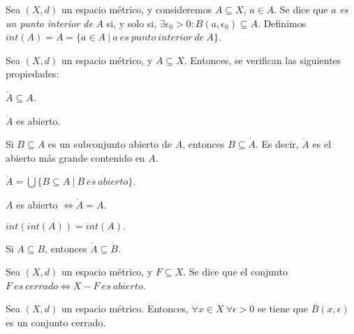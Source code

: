 \begin{ndef}
Sea $(X,d)$ un espacio métrico, y consideremos $A\subseteq X$, $a\in A$. Se dice que $a$ \emph{es un punto interior de} $A$ si, y solo si, $\exists \epsilon_0 > 0: B(a,\epsilon_0)\subseteq A$.  Definimos $int(A) = \mathring{A} = \{ a\in A \ | \ a\ es\ punto\ interior\ de\ A\}$.
\end{ndef}



\begin{nprop}
Sea $(X,d)$ un espacio métrico, y $A\subseteq X$. Entonces, se verifican las siguientes propiedades:

\begin{nlist}
\item $\mathring{A} \subseteq A$.

\item $\mathring{A}$ es abierto.

\item Si $B\subseteq A$ es un subconjunto abierto de $A$, entonces $B \subseteq \mathring{A}$. Es decir, $\mathring{A}$ es el abierto más grande contenido en $A$.

\item $\displaystyle \mathring{A}  = \bigcup \{ B\subseteq A \ | \ B\ es\ abierto \}$.

\item $A$ es abierto $\iff \mathring{A} =A$.

\item $int(int(A)) = int(A).$

\item Si $A\subseteq B$, entonces $\mathring{A} \subseteq \mathring{B}$.
\end{nlist}

\end{nprop}



\begin{ndef}
Sea $(X,d)$ un espacio métrico, y $F\subseteq X$. Se dice que el conjunto $F\ es\ cerrado \iff X-F\ es\ abierto$.
\end{ndef}



\begin{nprop}
Sea $(X,d)$ un espacio métrico. Entonces, $\forall x\in X \ \forall \epsilon > 0$ se tiene que $\overline{B}(x,\epsilon)$ es un conjunto cerrado.
\end{nprop}



